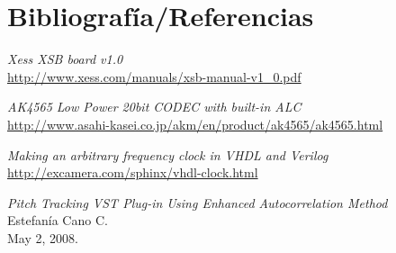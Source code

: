 \section{Bibliografía/Referencias}

\renewcommand*{\refname}{}


\begin{thebibliography}{9}


	\emph{Xess XSB board v1.0}\\
	\url{http://www.xess.com/manuals/xsb-manual-v1_0.pdf}
 

	\emph{AK4565 Low Power 20bit CODEC with built-in ALC}\\
	\url{http://www.asahi-kasei.co.jp/akm/en/product/ak4565/ak4565.html}

	\emph{Making an arbitrary frequency clock in VHDL and Verilog}\\
	\url{http://excamera.com/sphinx/vhdl-clock.html}

	\emph{Pitch Tracking VST Plug-in Using Enhanced Autocorrelation Method}\\
	Estefanía Cano C.\\
	May 2, 2008.

\end{thebibliography}
